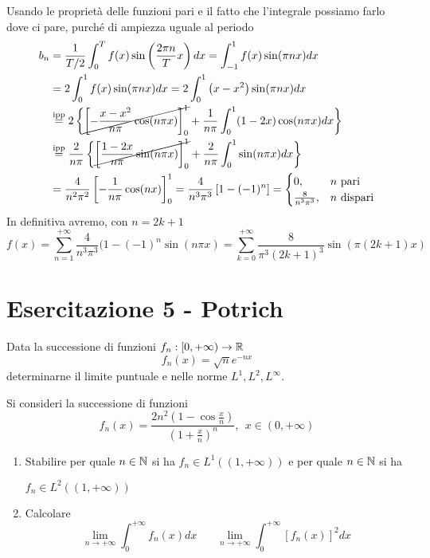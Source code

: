 Usando le proprietà delle funzioni pari e il fatto che l'integrale possiamo farlo dove ci pare, purché di ampiezza uguale al periodo
\begin{equation*}
\begin{aligned}
b_{n} & = \frac{1}{T/2}\int^{T}_{0} f(x)\sin\left(\frac{2\pi n}{T} x\right) dx = \int^{1}_{- 1} f(x)\sin(\pi nx) dx\\
 & = 2\int^{1}_{0} f(x)\sin(\pi nx) dx = 2\int^{1}_{0}\left(x - x^{2}\right)\sin(\pi nx) dx\\
 & \overset{\text{ipp}}{=} 2\left\{\cancel{\left[ - \frac{x - x^{2}}{n\pi}\cos(n\pi x)\right]^{1}_{0}} + \frac{1}{n\pi}\int^{1}_{0}(1 - 2x)\cos(n\pi x) dx\right\}\\
 & \overset{\text{ipp}}{=}\frac{2}{n\pi}\left\{\cancel{\left[\frac{1 - 2x}{n\pi}\sin(n\pi x)\right]^{1}_{0}} + \frac{2}{n\pi}\int^{1}_{0}\sin(n\pi x) dx\right\}\\
 & = \frac{4}{n^{2} \pi^{2}}\left[ - \frac{1}{n\pi}\cos (nx)\right]^{1}_{0} = \frac{4}{n^{3} \pi^{3}}\left[ 1 - (- 1)^{n}\right] = 
 \begin{cases}
0, & n\ \text{pari}\\
\frac{8}{n^{3} \pi^{3}}, & n\ \text{dispari}
\end{cases}
\end{aligned}
\end{equation*}
In definitiva avremo, con $n = 2k + 1$
\begin{equation*}
f(x) = \sum^{+ \infty}_{n = 1}\frac{4}{n^{3} \pi^{3}} (1 - (- 1)^{n}\sin (n\pi x) = \sum^{+ \infty}_{k = 0}\frac{8}{\pi^{3} (2k + 1)^{3}}\sin (\pi (2k + 1)x)
\end{equation*}
\chapter{Esercitazione 5 - Potrich}
\ParteEsercizi
\Esercizio{}

Data la successione di funzioni $f_{n} :[ 0, + \infty)\rightarrow \mathbb{R} $
\begin{equation*}
f_{n}(x) = \sqrt{n} e^{- nx}
\end{equation*}
determinarne il limite puntuale e nelle norme $L^{1}, L^{2}, L^{\infty}$.
\Esercizio{}

Si consideri la successione di funzioni
\begin{equation*}
f_{n} (x) = \frac{2n^{2}\left(1 - \cos\frac{x}{n}\right)}{\left(1 + \frac{x}{n}\right)^{n}}, \ \ x\in (0, + \infty)
\end{equation*}
\begin{enumerate}
\item Stabilire per quale $n\in \mathbb{N} $ si ha $f_{n} \in L^{1}((1, + \infty))$ e per quale $n\in \mathbb{N} $ si ha 

$f_{n} \in L^{2}((1, + \infty))$
\item Calcolare
\begin{equation*}
\lim\limits_{n\rightarrow + \infty}\int^{+ \infty}_{0} f_{n}(x) dx\ \ \ \ \ \ \ \ \lim\limits_{n\rightarrow + \infty}\int^{+ \infty}_{0}[ f_{n}(x)]^{2} dx
\end{equation*}
\end{enumerate}
\Esercizio{}

